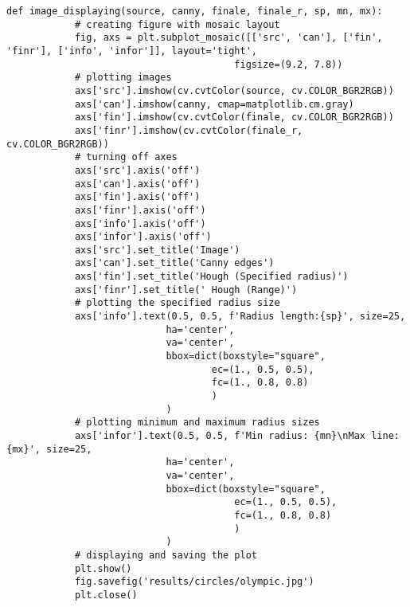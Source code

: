     \begin{lstlisting}[caption={Исходный код функции для создания сравнительного изображения с результатами преобразования}, label={lst:show_images}]
        def image_displaying(source, canny, finale, finale_r, sp, mn, mx):
            # creating figure with mosaic layout
            fig, axs = plt.subplot_mosaic([['src', 'can'], ['fin', 'finr'], ['info', 'infor']], layout='tight',
                                        figsize=(9.2, 7.8))
            # plotting images
            axs['src'].imshow(cv.cvtColor(source, cv.COLOR_BGR2RGB))
            axs['can'].imshow(canny, cmap=matplotlib.cm.gray)
            axs['fin'].imshow(cv.cvtColor(finale, cv.COLOR_BGR2RGB))
            axs['finr'].imshow(cv.cvtColor(finale_r, cv.COLOR_BGR2RGB))
            # turning off axes
            axs['src'].axis('off')
            axs['can'].axis('off')
            axs['fin'].axis('off')
            axs['finr'].axis('off')
            axs['info'].axis('off')
            axs['infor'].axis('off')
            axs['src'].set_title('Image')
            axs['can'].set_title('Canny edges')
            axs['fin'].set_title('Hough (Specified radius)')
            axs['finr'].set_title(' Hough (Range)')
            # plotting the specified radius size
            axs['info'].text(0.5, 0.5, f'Radius length:{sp}', size=25,
                            ha='center',
                            va='center',
                            bbox=dict(boxstyle="square",
                                    ec=(1., 0.5, 0.5),
                                    fc=(1., 0.8, 0.8)
                                    )
                            )
            # plotting minimum and maximum radius sizes
            axs['infor'].text(0.5, 0.5, f'Min radius: {mn}\nMax line: {mx}', size=25,
                            ha='center',
                            va='center',
                            bbox=dict(boxstyle="square",
                                        ec=(1., 0.5, 0.5),
                                        fc=(1., 0.8, 0.8)
                                        )
                            )
            # displaying and saving the plot
            plt.show()
            fig.savefig('results/circles/olympic.jpg')
            plt.close()
        \end{lstlisting}
